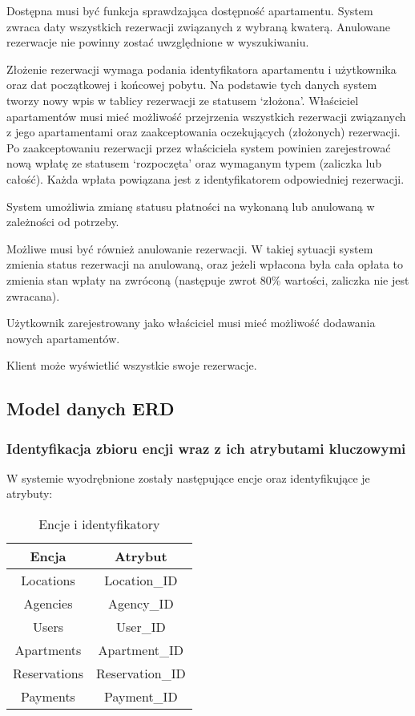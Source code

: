 \documentclass[polish, 11pt]{article}
\begin{document}
        Dostępna musi być funkcja sprawdzająca dostępność apartamentu.
        System zwraca daty wszystkich rezerwacji związanych z wybraną kwaterą.
        Anulowane rezerwacje nie powinny zostać uwzględnione w wyszukiwaniu.

        Złożenie rezerwacji wymaga podania identyfikatora apartamentu i użytkownika oraz dat początkowej i końcowej pobytu.
        Na podstawie tych danych system tworzy nowy wpis w tablicy rezerwacji ze statusem `złożona'.
        Właściciel apartamentów musi mieć możliwość przejrzenia wszystkich rezerwacji związanych z jego apartamentami
        oraz zaakceptowania oczekujących (złożonych) rezerwacji.
        Po zaakceptowaniu rezerwacji przez właściciela system powinien zarejestrować nową wpłatę ze statusem `rozpoczęta'
        oraz wymaganym typem (zaliczka lub całość).
        Każda wpłata powiązana jest z identyfikatorem odpowiedniej rezerwacji.

        System umożliwia zmianę statusu płatności na wykonaną lub anulowaną w zależności od potrzeby.

        Możliwe musi być również anulowanie rezerwacji.
        W takiej sytuacji system zmienia status rezerwacji na anulowaną,
        oraz jeżeli wpłacona była cała opłata to zmienia stan wpłaty na zwróconą
        (następuje zwrot 80\% wartości, zaliczka nie jest zwracana).

        Użytkownik zarejestrowany jako właściciel musi mieć możliwość dodawania nowych apartamentów.
        
        Klient może wyświetlić wszystkie swoje rezerwacje.
    
    \subsection{Model danych ERD}
        \subsubsection{Identyfikacja zbioru encji wraz z ich atrybutami kluczowymi}
            W systemie wyodrębnione zostały następujące encje oraz identyfikujące je atrybuty:
            \begin{table}[h]
                \centering
                \caption{Encje i identyfikatory}\label{tab:entitiesID}
                \begin{tabular}{cc}\toprule
                    Encja   	    &	Atrybut	\\\midrule
                    Locations	    &	Location\_ID	\\
                    Agencies	    &	Agency\_ID	\\
                    Users   	    &	User\_ID	\\
                    Apartments	    &	Apartment\_ID	\\
                    Reservations	&	Reservation\_ID	\\
                    Payments	    &	Payment\_ID	\\
                \bottomrule
                \end{tabular}
            \end{table}
\end{document}
